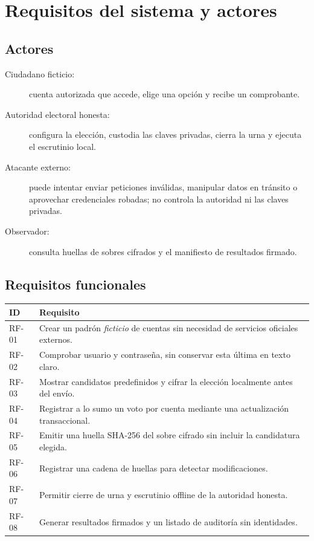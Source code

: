 \section{Requisitos del sistema y actores}
\subsection{Actores}
\begin{description}
\item[Ciudadano ficticio:] cuenta autorizada que accede, elige una opción y recibe un comprobante.
\item[Autoridad electoral honesta:] configura la elección, custodia las claves privadas, cierra la urna y ejecuta el escrutinio local.
\item[Atacante externo:] puede intentar enviar peticiones inválidas, manipular datos en tránsito o aprovechar credenciales robadas; no controla la autoridad ni las claves privadas.
\item[Observador:] consulta huellas de sobres cifrados y el manifiesto de resultados firmado.
\end{description}

\subsection{Requisitos funcionales}
\begin{longtable}{p{1.4cm}p{12.5cm}}
\toprule ID & Requisito\\ \midrule\endhead
RF-01 & Crear un padrón \emph{ficticio} de cuentas sin necesidad de servicios oficiales externos.\\
RF-02 & Comprobar usuario y contraseña, sin conservar esta última en texto claro.\\
RF-03 & Mostrar candidatos predefinidos y cifrar la elección localmente antes del envío.\\
RF-04 & Registrar a lo sumo un voto por cuenta mediante una actualización transaccional.\\
RF-05 & Emitir una huella SHA-256 del sobre cifrado sin incluir la candidatura elegida.\\
RF-06 & Registrar una cadena de huellas para detectar modificaciones.\\
RF-07 & Permitir cierre de urna y escrutinio offline de la autoridad honesta.\\
RF-08 & Generar resultados firmados y un listado de auditoría sin identidades.\\
\bottomrule
\end{longtable}

